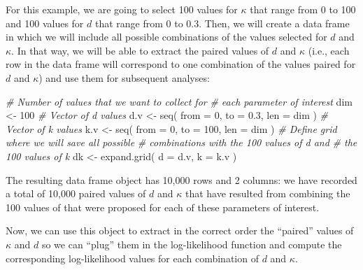 \documentclass[
]{article}
\newenvironment{Shaded}{\begin{snugshade}}{\end{snugshade}}
\newcommand{\AttributeTok}[1]{\textcolor[rgb]{0.77,0.63,0.00}{#1}}
\newcommand{\CommentTok}[1]{\textcolor[rgb]{0.56,0.35,0.01}{\textit{#1}}}
\newcommand{\DecValTok}[1]{\textcolor[rgb]{0.00,0.00,0.81}{#1}}
\newcommand{\FloatTok}[1]{\textcolor[rgb]{0.00,0.00,0.81}{#1}}
\newcommand{\FunctionTok}[1]{\textcolor[rgb]{0.00,0.00,0.00}{#1}}
\newcommand{\NormalTok}[1]{#1}
\newcommand{\OtherTok}[1]{\textcolor[rgb]{0.56,0.35,0.01}{#1}}
\newcommand{\SpecialCharTok}[1]{\textcolor[rgb]{0.00,0.00,0.00}{#1}}
\begin{document}
For this example, we are going to select 100 values for \(\kappa\) that
range from 0 to 100 and 100 values for \(d\) that range from 0 to 0.3.
Then, we will create a data frame in which we will include all possible
combinations of the values selected for \(d\) and \(\kappa\). In that
way, we will be able to extract the paired values of \(d\) and
\(\kappa\) (i.e., each row in the data frame will correspond to one
combination of the values paired for \(d\) and \(\kappa\)) and use them
for subsequent analyses:

\begin{Shaded}
\begin{Highlighting}[]
\CommentTok{\# Number of values that we want to collect for }
\CommentTok{\# each parameter of interest}
\NormalTok{dim }\OtherTok{\textless{}{-}} \DecValTok{100}
\CommentTok{\# Vector of \textasciigrave{}d\textasciigrave{} values}
\NormalTok{d.v }\OtherTok{\textless{}{-}} \FunctionTok{seq}\NormalTok{( }\AttributeTok{from =} \DecValTok{0}\NormalTok{, }\AttributeTok{to =} \FloatTok{0.3}\NormalTok{, }\AttributeTok{len =}\NormalTok{ dim )}
\CommentTok{\# Vector of \textasciigrave{}k\textasciigrave{} values}
\NormalTok{k.v }\OtherTok{\textless{}{-}} \FunctionTok{seq}\NormalTok{( }\AttributeTok{from =} \DecValTok{0}\NormalTok{, }\AttributeTok{to =} \DecValTok{100}\NormalTok{, }\AttributeTok{len =}\NormalTok{ dim )}
\CommentTok{\# Define grid where we will save all possible }
\CommentTok{\# combinations with the 100 values of \textasciigrave{}d\textasciigrave{} and }
\CommentTok{\# the 100 values of \textasciigrave{}k\textasciigrave{}}
\NormalTok{dk  }\OtherTok{\textless{}{-}} \FunctionTok{expand.grid}\NormalTok{( }\AttributeTok{d =}\NormalTok{ d.v, }\AttributeTok{k =}\NormalTok{ k.v )}
\end{Highlighting}
\end{Shaded}

The resulting data frame object has 10,000 rows and 2 columns: we have
recorded a total of 10,000 paired values of \(d\) and \(\kappa\) that
have resulted from combining the 100 values of that were proposed for
each of these parameters of interest.

Now, we can use this object to extract in the correct order the
``paired'' values of \(\kappa\) and \(d\) so we can ``plug'' them in the
log-likelihood function and compute the corresponding log-likelihood
values for each combination of \(d\) and \(\kappa\).

\begin{Shaded}
\end{Shaded}
\end{document}
